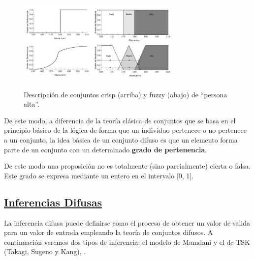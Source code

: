 \documentclass[10pt,conference]{IEEEtran}
\begin{document}
\begin{figure}[H]
\begin{center}
\includegraphics[width=8cm, height=5cm]{figuras/H1.JPG}
\caption{Descripción de conjuntos crisp (arriba) y fuzzy (abajo) de “persona alta”.}
\label{H1} 
\end{center}
\end{figure}

De este modo, a diferencia de la teoría clásica de conjuntos que se basa en el principio básico de la lógica de forma que un individuo pertenece o no pertenece a un conjunto, la idea básica de un conjunto difuso es que un elemento forma parte de un conjunto con un determinado \textbf{grado de pertenencia}.\par
De este modo una proposición no es totalmente (sino parcialmente) cierta o falsa. Este grado se expresa mediante un entero en el intervalo [0, 1].\par


\subsection{\textbf{\underline{Inferencias Difusas}}}
La inferencia difusa puede definirse como el proceso de obtener
un valor de salida para un valor de entrada empleando la teoría de
conjuntos difusos. A continuación veremos dos tipos de inferencia: el
modelo de Mamdani y el de TSK (Takagi, Sugeno y Kang), \citep{gonzalez2015logica}.
\end{document}
